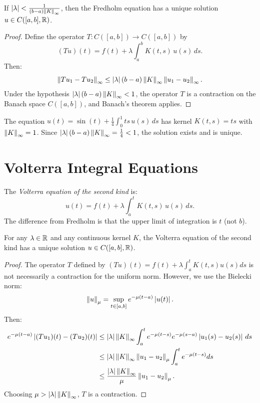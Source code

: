 \begin{theorem}
\label{thm:fredholm}
If $\left| \lambda \right| < \frac{1}{(b-a) \left\| K \right\|_\infty}$, then the Fredholm equation has a
unique solution $u \in C([a,b], \mathbb{R})$.
\end{theorem}

\begin{proof}
Define the operator $T\colon C([a,b]) \to C([a,b])$ by
\[
  (Tu)(t) = f(t) + \lambda \int_a^b K(t,s) \, u(s) \, ds.
\]
Then:
\[
  \left\| Tu_1 - Tu_2 \right\|_\infty \leq \left| \lambda \right| (b-a) \left\| K \right\|_\infty \left\| u_1 - u_2 \right\|_\infty.
\]
Under the hypothesis $\left| \lambda \right| (b-a) \left\| K \right\|_\infty < 1$, the operator $T$ is a
contraction on the Banach space $C([a,b])$, and Banach's theorem applies.
\end{proof}

\begin{example}
The equation $u(t) = \sin(t) + \frac{1}{4} \int_0^1 ts \, u(s) \, ds$ has kernel
$K(t,s) = ts$ with $\left\| K \right\|_\infty = 1$. Since
$\left| \lambda \right|(b-a)\left\| K \right\|_\infty = \frac{1}{4} < 1$, the solution exists and is unique.
\end{example}

\section{Volterra Integral Equations}

\begin{definition}
The \emph{Volterra equation of the second kind} is:
\[
  u(t) = f(t) + \lambda \int_a^t K(t,s) \, u(s) \, ds.
\]
The difference from Fredholm is that the upper limit of integration is $t$ (not $b$).
\end{definition}

\begin{theorem}
\label{thm:volterra}
For any $\lambda \in \mathbb{R}$ and any continuous kernel $K$, the Volterra equation of the second
kind has a unique solution $u \in C([a,b], \mathbb{R})$.
\end{theorem}

\begin{proof}
The operator $T$ defined by $(Tu)(t) = f(t) + \lambda \int_a^t K(t,s) u(s) ds$ is not
necessarily a contraction for the uniform norm. However, we use the Bielecki norm:
\[
  \left\| u \right\|_\mu = \sup_{t \in [a,b]} e^{-\mu(t-a)} \left| u(t) \right|.
\]
Then:
\begin{align*}
  e^{-\mu(t-a)} \left| (Tu_1)(t) - (Tu_2)(t) \right|
  &\leq \left| \lambda \right| \left\| K \right\|_\infty \int_a^t e^{-\mu(t-s)} e^{-\mu(s-a)} \left| u_1(s) - u_2(s) \right| \, ds \\
  &\leq \left| \lambda \right| \left\| K \right\|_\infty \left\| u_1 - u_2 \right\|_\mu \int_a^t e^{-\mu(t-s)} ds \\
  &\leq \frac{\left| \lambda \right| \left\| K \right\|_\infty}{\mu} \left\| u_1 - u_2 \right\|_\mu.
\end{align*}
Choosing $\mu > \left| \lambda \right| \left\| K \right\|_\infty$, $T$ is a contraction.
\end{proof}


